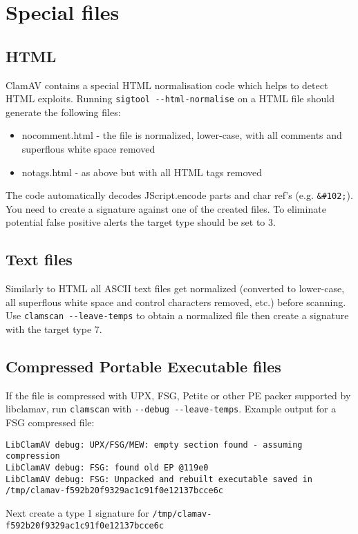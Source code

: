 \documentclass[a4paper,titlepage,12pt]{article}
\begin{document}
    \section{Special files}

    \subsection{HTML}
    ClamAV contains a special HTML normalisation code which helps to detect
    HTML exploits. Running \verb+sigtool --html-normalise+ on a HTML file
    should generate the following files:
    \begin{itemize}
	\item nocomment.html - the file is normalized, lower-case, with all
	comments and superflous white space removed
	\item notags.html - as above but with all HTML tags removed
    \end{itemize}
    The code automatically decodes JScript.encode parts and char ref's (e.g.
    \verb+&#102;+). You need to create a signature against one of the created
    files. To eliminate potential false positive alerts the target type should
    be set to 3.

    \subsection{Text files}
    Similarly to HTML all ASCII text files get normalized (converted
    to lower-case, all superflous white space and control characters removed,
    etc.) before scanning. Use \verb+clamscan --leave-temps+ to obtain
    a normalized file then create a signature with the target type 7.

    \subsection{Compressed Portable Executable files}
    If the file is compressed with UPX, FSG, Petite or other PE packer
    supported by libclamav, run \verb+clamscan+ with
    \verb+--debug --leave-temps+. Example output for a FSG compressed file:
    \begin{verbatim}
LibClamAV debug: UPX/FSG/MEW: empty section found - assuming compression
LibClamAV debug: FSG: found old EP @119e0
LibClamAV debug: FSG: Unpacked and rebuilt executable saved in
/tmp/clamav-f592b20f9329ac1c91f0e12137bcce6c
    \end{verbatim}
    Next create a type 1 signature for \verb+/tmp/clamav-f592b20f9329ac1c91f0e12137bcce6c+
\end{document}
